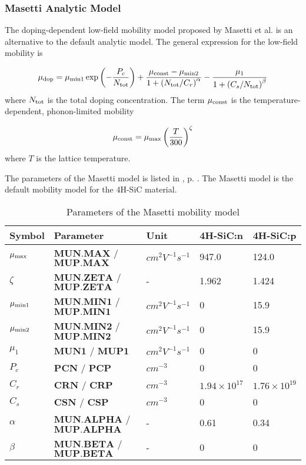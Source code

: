 \documentclass[oneside,12pt]{cgd_book}
\begin{document}
\subsubsection{Masetti Analytic Model}
\label{sec:Equation:Mobility:Bulk:Masetti}
The doping-dependent low-field mobility model proposed by Masetti et
          al.\cite[Masetti1983]{} is an alternative to the default analytic model. The general expression
          for the low-field mobility is
\par
\begin{equation}
\mu_{\rm dop} = \mu_{\rm min1} \exp\left( -\frac{P_c} {N_{\rm tot}} \right) + \frac{\mu_{\rm
            const} - \mu_{\rm min2}}{1+\left( N_{\rm tot}/C_r \right)^\alpha } - \frac{\mu_1}{1 + \left( C_s/N_{\rm tot}
            \right)^\beta }
\end{equation}
where $N_{\rm tot}$ is the total doping concentration. The term
$\mu_{\rm const}$ is the temperature-dependent, phonon-limited mobility
\par
\begin{equation}
\mu_{\rm const} = \mu_{\rm max} \left( \frac{T}{300} \right)^{\zeta}
\end{equation}
where $T$ is the lattice temperature.
\par
The parameters of the Masetti model is listed in ,
p. \pageref{tab:Equation:Mobility:Masetti:Param}.
          The Masetti model is the default mobility model for the 4H-SiC material.
\par
\begin{longtable}{lllll}
\caption{\label{tab:Equation:Mobility:Masetti:Param}Parameters of the Masetti mobility model} \\
\hline
 Symbol
& Parameter
& Unit
& 4H-SiC:n
& 4H-SiC:p\\
\hline
$\mu_{\rm max}$
& $\mathbf{MUN.MAX}$ / $\mathbf{MUP.MAX}$
& $cm^2V^{-1}s^{-1}$
& 947.0
& 124.0
\\
 $\zeta$
& $\mathbf{MUN.ZETA}$ / $\mathbf{MUP.ZETA}$
& -
& 1.962
& 1.424
\\
 $\mu_{\rm min1}$
& $\mathbf{MUN.MIN1}$ / $\mathbf{MUP.MIN1}$
& $cm^2V^{-1}s^{-1}$
& 0
& 15.9
\\
 $\mu_{\rm min2}$
& $\mathbf{MUN.MIN2}$ / $\mathbf{MUP.MIN2}$
& $cm^2V^{-1}s^{-1}$
& 0
& 15.9
\\
 $\mu_1$
& $\mathbf{MUN1}$ / $\mathbf{MUP1}$
& $cm^2V^{-1}s^{-1}$
& 0
& 0
\\
 $P_c$
& $\mathbf{PCN}$ / $\mathbf{PCP}$
& $cm^{-3}$
& 0
& 0
\\
 $C_r$
& $\mathbf{CRN}$ / $\mathbf{CRP}$
& $cm^{-3}$
& $1.94\times 10^{17}$
& $1.76\times 10^{19}$
\\
 $C_s$
& $\mathbf{CSN}$ / $\mathbf{CSP}$
& $cm^{-3}$
& 0
& 0
\\
 $\alpha$
& $\mathbf{MUN.ALPHA}$ / $\mathbf{MUP.ALPHA}$
& -
& 0.61
& 0.34
\\
 $\beta$
& $\mathbf{MUN.BETA}$ / $\mathbf{MUP.BETA}$
& -
& 0
& 0\\
\end{longtable}
\end{document}
